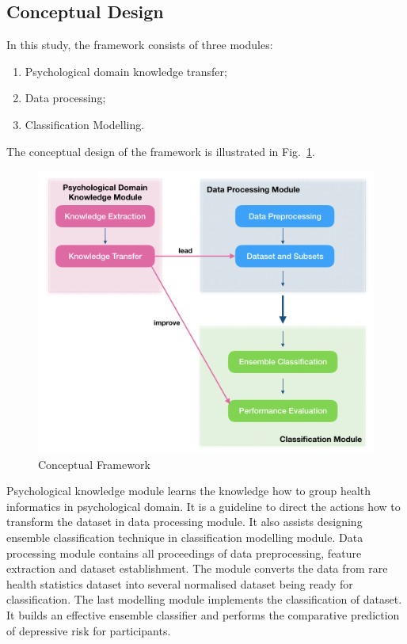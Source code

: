 \documentclass[10pt,journal,compsoc]{IEEEtran}
\begin{document}
\subsection{Conceptual Design}
In this study, the framework consists of three modules:
\begin{enumerate}
  \item Psychological domain knowledge transfer;
  \item Data processing;
  \item Classification Modelling.
\end{enumerate}
The conceptual design of the framework is illustrated in Fig.~\ref{fig1}.
\begin{figure}[h]
\includegraphics[width=1\textwidth]{concepts.png}
\caption{Conceptual Framework} \label{fig1}
\end{figure}
%
Psychological knowledge module learns the knowledge how to group health informatics in psychological domain. It is a guideline to direct the actions how to transform the dataset in data processing module. It also assists designing ensemble classification technique in classification modelling module. Data processing module contains all proceedings of data preprocessing, feature extraction and dataset establishment. The module converts the data from rare health statistics dataset into several normalised dataset being ready for classification. The last modelling module implements the classification of dataset. It builds an effective ensemble classifier and performs the comparative prediction of depressive risk for participants. 
\end{document}
